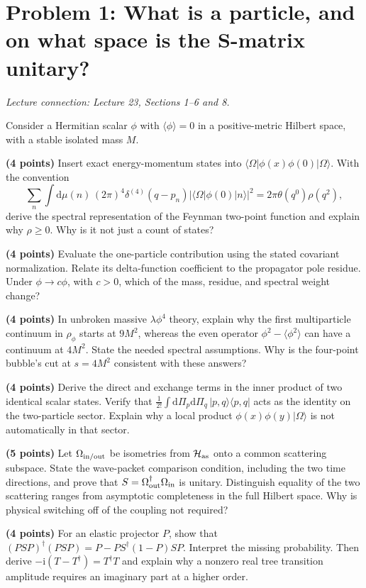 \documentclass[11pt]{article}
\newcommand{\dd}{\mathrm d}
\newcommand{\ii}{\mathrm i}
\newcommand{\ket}[1]{\lvert#1\rangle}
\newcommand{\dPi}{\dd\Pi}
\newcommand{\cH}{\mathcal H}
\newcommand{\problem}[2]{\clearpage\section*{\color{qftblue}Problem #1: #2}}
\newcommand{\connection}[1]{{\small\textit{Lecture connection: #1}\par}\medskip}
\begin{document}
\problem{1}{What is a particle, and on what space is the S-matrix unitary?}
\connection{Lecture 23, Sections 1--6 and 8.}
Consider a Hermitian scalar \(\phi\) with \(\langle\phi\rangle=0\) in a
positive-metric Hilbert space, with a stable isolated mass \(M\).
\begin{parts}
\item \textbf{(4 points)} Insert exact energy-momentum states into
\(\langle\Omega|\phi(x)\phi(0)|\Omega\rangle\). With the convention
\[
 \sum_n\int\dd\mu(n)\,(2\pi)^4\delta^{(4)}(q-p_n)
 |\langle\Omega|\phi(0)|n\rangle|^2=2\pi\theta(q^0)\rho(q^2),
\]
derive the spectral representation of the Feynman two-point function
and explain why \(\rho\geq0\). Why is it not just a count of states?

\item \textbf{(4 points)} Evaluate the one-particle contribution using
the stated covariant normalization. Relate its delta-function coefficient
to the propagator pole residue. Under \(\phi\to c\phi\), with \(c>0\),
which of the mass, residue, and spectral weight change?

\item \textbf{(4 points)} In unbroken massive \(\lambda\phi^4\) theory,
explain why the first multiparticle continuum in \(\rho_\phi\) starts at
\(9M^2\), whereas the even operator
\(\phi^2-\langle\phi^2\rangle\) can have a continuum at \(4M^2\).
State the needed spectral assumptions. Why is the four-point bubble's
cut at \(s=4M^2\) consistent with these answers?

\item \textbf{(4 points)} Derive the direct and exchange terms in the
inner product of two identical scalar states. Verify that
\(\tfrac1{2!}\int\dPi_p\dPi_q\,|p,q\rangle\langle p,q|\)
acts as the identity on the two-particle sector. Explain why a local
product \(\phi(x)\phi(y)\ket{\Omega}\) is not automatically in that sector.

\item \textbf{(5 points)} Let \(\Omega_{\rm in/out}\) be isometries from
\(\cH_{\rm as}\) onto a common scattering subspace. State the wave-packet
comparison condition, including the two time directions, and prove that
\(S=\Omega_{\rm out}^\dagger\Omega_{\rm in}\) is unitary. Distinguish
equality of the two scattering ranges from asymptotic completeness in
the full Hilbert space. Why is physical switching off of the coupling
not required?

\item \textbf{(4 points)} For an elastic projector \(P\), show that
\((PSP)^\dagger(PSP)=P-PS^\dagger(1-P)SP\). Interpret the missing probability.
Then derive \(-\ii(T-T^\dagger)=T^\dagger T\) and explain why a nonzero real
tree transition amplitude requires an imaginary part at a higher order.
\end{parts}
\end{document}
